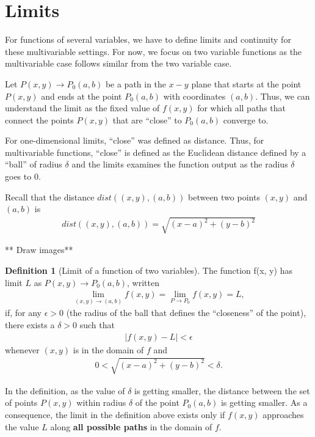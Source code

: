 \documentclass[
]{book}
\theoremstyle{definition}
\newtheorem{definition}{Definition}[chapter]
\theoremstyle{definition}
\theoremstyle{definition}
\theoremstyle{definition}
\theoremstyle{remark}
\begin{document}
\hypertarget{limits}{%
\section{Limits}\label{limits}}

For functions of several variables, we have to define limits and continuity for these multivariable settings. For now, we focus on two variable functions as the multivariable case follows similar from the two variable case.

Let \(P(x, y) \rightarrow P_0(a, b)\) be a path in the \(x-y\) plane that starts at the point \(P(x, y)\) and ends at the point \(P_0(a, b)\) with coordinates \((a, b)\). Thus, we can understand the limit as the fixed value of \(f(x, y)\) for which all paths that connect the points \(P(x, y)\) that are ``close'' to \(P_0(a, b)\) converge to.

For one-dimensional limits, ``close'' was defined as distance. Thus, for multivariable functions, ``close'' is defined as the Euclidean distance defined by a ``ball'' of radius \(\delta\) and the limits examines the function output as the radius \(\delta\) goes to 0.

Recall that the distance \(dist((x, y), (a, b))\) between two points \((x, y)\) and \((a, b)\) is
\[
\begin{aligned}
dist((x, y), (a, b)) = \sqrt{(x-a)^2 + (y-b)^2}
\end{aligned}
\]

** Draw images**

\begin{definition}[Limit of a function of two variables]
The function f(x, y) has limit \(L\) as \(P(x, y) \rightarrow P_0(a, b)\), written
\[
\begin{aligned}
\lim_{(x, y) \rightarrow (a, b)} f(x, y) = \lim_{P \rightarrow P_0} f(x, y) = L,
\end{aligned}
\]
if, for any \(\epsilon > 0\) (the radius of the ball that defines the ``closeness'' of the point), there exists a \(\delta > 0\) such that
\[
\begin{aligned}
|f(x, y) - L| < \epsilon
\end{aligned}
\]
whenever \((x, y)\) is in the domain of \(f\) and
\[
\begin{aligned}
0 < \sqrt{(x-a)^2 + (y-b)^2} < \delta.
\end{aligned}
\]
\end{definition}

In the definition, as the value of \(\delta\) is getting smaller, the distance between the set of points \(P(x, y)\) within radius \(\delta\) of the point \(P_0(a, b)\) is getting smaller. As a consequence, the limit in the definition above exists only if \(f(x, y)\) approaches the value \(L\) along \textbf{all possible paths} in the domain of \(f\).
\end{document}
